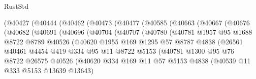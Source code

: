 \begin{lexlean}{RustStd}
\begin{coremodule}
{\begin{coremodule}
{{{{{{{{{{{{{{{{{{{{{{{{{{{{{{{{{{{{{{{{{{{{{{{{{{{{{{{{{{{{{{{{{{{{{{{{{{{{{{{{              (@40427
                (@40444
                  (@40462
                    (@40473
                      (@40477
                        (@40585
                          (@40663
                            (@40667
                              (@40676
                                (@40682
                                  (@40691
                                    (@40696
                                      (@40704
                                        (@40707
                                          (@40780
                                            (@40781
                                              @1957
                                              @95
                                              @1688
                                              @8722
                                              @8789
                                              @40526
                                              (@40620
                                                @1955
                                                @169
                                                @1295
                                                @57
                                                @8787
                                                @4838
                                                (@26561
                                                  @40461
                                                  @4454
                                                  @419
                                                  @334
                                                  @95
                                                  @11
                                                  @8722
                                                  @5153
                                                  (@40781
                                                    @1300
                                                    @95
                                                    @76
                                                    @8722
                                                    @26575
                                                    @40526
                                                    (@40620
                                                      @334
                                                      @169
                                                      @11
                                                      @57
                                                      @5153
                                                      @4838
                                                      (@40539 @11 @333 @5153 @13639 @13643)
}}}}}}}}}}}}}}}}}}}}}}}}}}}}}}}}}}}}}}}}}}}}}}}}}}}}}}}}}}}}}}}}}}}}}}}}}}}}}}}}
\end{coremodule}}
\end{coremodule}
\end{lexlean}

